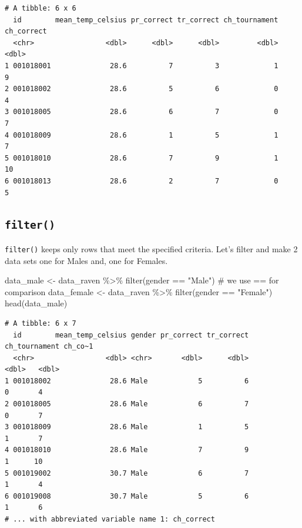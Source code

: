 \documentclass[
  letterpaper,
]{book}
\newenvironment{Shaded}{\begin{snugshade}}{\end{snugshade}}
\newcommand{\CommentTok}[1]{\textcolor[rgb]{0.37,0.37,0.37}{#1}}
\newcommand{\FunctionTok}[1]{\textcolor[rgb]{0.28,0.35,0.67}{#1}}
\newcommand{\NormalTok}[1]{\textcolor[rgb]{0.00,0.23,0.31}{#1}}
\newcommand{\OtherTok}[1]{\textcolor[rgb]{0.00,0.23,0.31}{#1}}
\newcommand{\SpecialCharTok}[1]{\textcolor[rgb]{0.37,0.37,0.37}{#1}}
\newcommand{\StringTok}[1]{\textcolor[rgb]{0.13,0.47,0.30}{#1}}
\begin{document}
\begin{verbatim}
# A tibble: 6 x 6
  id        mean_temp_celsius pr_correct tr_correct ch_tournament ch_correct
  <chr>                 <dbl>      <dbl>      <dbl>         <dbl>      <dbl>
1 001018001              28.6          7          3             1          9
2 001018002              28.6          5          6             0          4
3 001018005              28.6          6          7             0          7
4 001018009              28.6          1          5             1          7
5 001018010              28.6          7          9             1         10
6 001018013              28.6          2          7             0          5
\end{verbatim}

\hypertarget{filter}{%
\subsection{\texorpdfstring{\texttt{filter()}}{filter()}}\label{filter}}

\texttt{filter()} keeps only rows that meet the specified criteria.
Let's filter and make 2 data sets one for Males and, one for Females.

\begin{Shaded}
\begin{Highlighting}[]
\NormalTok{data\_male }\OtherTok{\textless{}{-}}\NormalTok{ data\_raven }\SpecialCharTok{\%\textgreater{}\%} \FunctionTok{filter}\NormalTok{(gender }\SpecialCharTok{==} \StringTok{"Male"}\NormalTok{) }\CommentTok{\# we use == for comparison}
\NormalTok{data\_female }\OtherTok{\textless{}{-}}\NormalTok{ data\_raven }\SpecialCharTok{\%\textgreater{}\%} \FunctionTok{filter}\NormalTok{(gender }\SpecialCharTok{==} \StringTok{"Female"}\NormalTok{)}
\FunctionTok{head}\NormalTok{(data\_male)}
\end{Highlighting}
\end{Shaded}

\begin{verbatim}
# A tibble: 6 x 7
  id        mean_temp_celsius gender pr_correct tr_correct ch_tournament ch_co~1
  <chr>                 <dbl> <chr>       <dbl>      <dbl>         <dbl>   <dbl>
1 001018002              28.6 Male            5          6             0       4
2 001018005              28.6 Male            6          7             0       7
3 001018009              28.6 Male            1          5             1       7
4 001018010              28.6 Male            7          9             1      10
5 001019002              30.7 Male            6          7             1       4
6 001019008              30.7 Male            5          6             1       6
# ... with abbreviated variable name 1: ch_correct
\end{verbatim}
\end{document}
